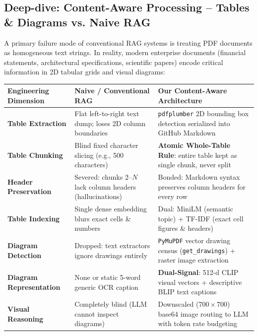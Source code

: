 \documentclass[11pt,a4paper]{article}
\begin{document}
\subsection{Deep-dive: Content-Aware Processing -- Tables \& Diagrams vs. Naive RAG}
A primary failure mode of conventional RAG systems is treating PDF documents as homogeneous text strings. In reality, modern enterprise documents (financial statements, architectural specifications, scientific papers) encode critical information in 2D tabular grids and visual diagrams:

{\footnotesize
\begin{center}
\begin{tabular}{@{}lp{5.0cm}p{6.8cm}@{}}
\toprule
Engineering Dimension & Naive / Conventional RAG & Our Content-Aware Architecture \\
\midrule
\textbf{Table Extraction} & Flat left-to-right text dump; loses 2D column boundaries & \texttt{pdfplumber} 2D bounding box detection serialized into GitHub Markdown \\
\textbf{Table Chunking} & Blind fixed character slicing (e.g., 500 characters) & \textbf{Atomic Whole-Table Rule}: entire table kept as single chunk, never split \\
\textbf{Header Preservation} & Severed: chunks 2--$N$ lack column headers (hallucinations) & Bonded: Markdown syntax preserves column headers for every row \\
\textbf{Table Indexing} & Single dense embedding blurs exact cells \& numbers & Dual: MiniLM (semantic topic) + TF-IDF (exact cell figures \& headers) \\
\textbf{Diagram Detection} & Dropped: text extractors ignore drawings entirely & \texttt{PyMuPDF} vector drawing census (\texttt{get\_drawings}) + raster image extraction \\
\textbf{Diagram Representation} & None or static 5-word generic OCR caption & \textbf{Dual-Signal}: 512-d CLIP visual vectors + descriptive BLIP text captions \\
\textbf{Visual Reasoning} & Completely blind (LLM cannot inspect diagrams) & Downscaled ($700\times700$) base64 image routing to LLM with token rate budgeting \\
\bottomrule
\end{tabular}
\end{center}
}
\end{document}
